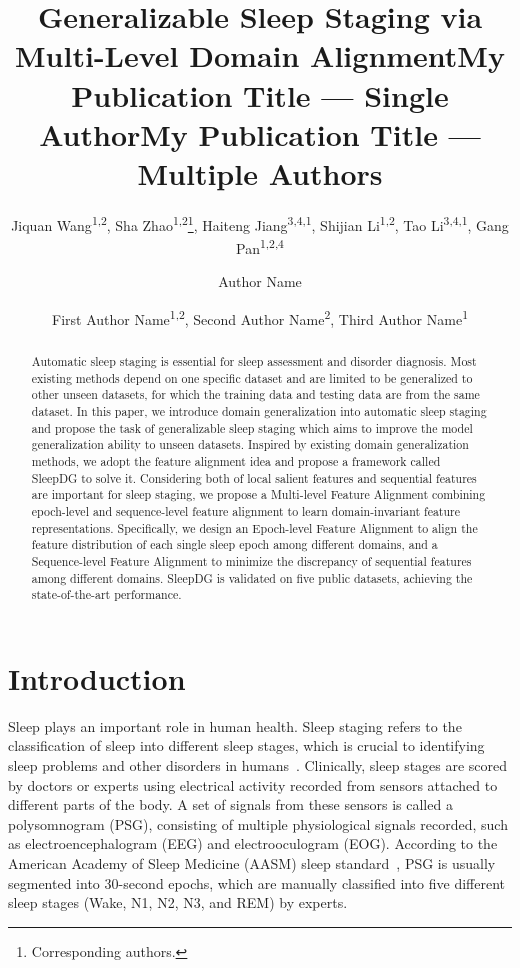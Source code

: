 \documentclass[letterpaper]{article} %
\title{Generalizable Sleep Staging via Multi-Level Domain Alignment}
\author{
	Jiquan Wang\textsuperscript{\rm 1,\rm 2},
	Sha Zhao\textsuperscript{\rm 1,\rm 2}\thanks{Corresponding authors.},
	Haiteng Jiang\textsuperscript{\rm 3,\rm 4,\rm 1},
	Shijian Li\textsuperscript{\rm 1,\rm 2},
	Tao Li\textsuperscript{\rm 3,\rm 4,\rm 1},
	Gang Pan\textsuperscript{\rm 1,\rm 2,\rm 4}\footnotemark[1]
}
\title{My Publication Title --- Single Author}
\author {
    Author Name
}
\title{My Publication Title --- Multiple Authors}
\author {
    First Author Name\textsuperscript{\rm 1,\rm 2},
    Second Author Name\textsuperscript{\rm 2},
    Third Author Name\textsuperscript{\rm 1}
}
\begin{document}
	\maketitle

	\begin{abstract}
		Automatic sleep staging is essential for sleep assessment and disorder diagnosis. Most existing methods depend on one specific dataset and are limited to be generalized to other unseen datasets, for which the training data and testing data are from the same dataset. In this paper, we introduce domain generalization into automatic sleep staging and propose the task of generalizable sleep staging which aims to improve the model generalization ability to unseen datasets. Inspired by existing domain generalization methods, we adopt the feature alignment idea and propose a framework called SleepDG to solve it. Considering both of local salient features and sequential features are important for sleep staging, we propose a Multi-level Feature Alignment combining epoch-level and sequence-level feature alignment to learn domain-invariant feature representations. Specifically, we design an Epoch-level Feature Alignment to align the feature distribution of each single sleep epoch among different domains, and a Sequence-level Feature Alignment to minimize the discrepancy of sequential features among different domains. SleepDG is validated on five public datasets, achieving the state-of-the-art performance.

	\end{abstract}

	\section{Introduction}

	Sleep plays an important role in human health.
	Sleep staging refers to the classification of sleep into different sleep stages, which is crucial to identifying sleep problems and other disorders in humans~\citep{he2018effects}.
	Clinically, sleep stages are scored by doctors or experts using electrical activity recorded from sensors attached to different parts of the body.
	A set of signals from these sensors is called a polysomnogram (PSG), consisting of multiple physiological signals recorded, such as electroencephalogram (EEG) and electrooculogram (EOG).
	According to the American Academy of Sleep Medicine (AASM) sleep standard~\citep{Iber2007TheAA}, PSG is usually segmented into 30-second epochs, which are manually classified into five different sleep stages (Wake, N1, N2, N3, and REM) by experts.
\end{document}
